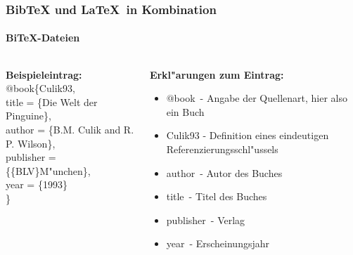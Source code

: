 \begin{frame}
\frametitle{BibTeX und \LaTeX ~in Kombination}
\framesubtitle{BiTeX-Dateien}
\begin{columns}
\begin{column}{0.52\textwidth}
\textbf{Beispieleintrag:}\\[1em]

\color{nounibaredI}$@$book\color{black}\{Culik93,\\
\color{nounibaredI}title\color{black} = \{Die Welt der Pinguine\},\\
\color{nounibaredI}author\color{black} = \{B.M. Culik and R. P. Wilson\},\\
\color{nounibaredI}publisher\color{black} = \{\{BLV\}M"unchen\},\\
\color{nounibaredI}year\color{black} = \{1993\}\\
\}
\end{column}
\begin{column}{0.55\textwidth}
\textbf{Erkl"arungen zum Eintrag:}
\begin{itemize}
\item \color{nounibaredI}$@$book\color{black}~- Angabe der Quellenart, hier also ein Buch
\item Culik93 - Definition eines eindeutigen Referenzierungsschl"ussels
\item \color{nounibaredI}author\color{black}~- Autor des Buches
\item \color{nounibaredI}title\color{black}~- Titel des Buches
\item \color{nounibaredI}publisher\color{black}~- Verlag
\item \color{nounibaredI}year\color{black}~- Erscheinungsjahr
\end{itemize}
\end{column}
\end{columns}

\end{frame}

